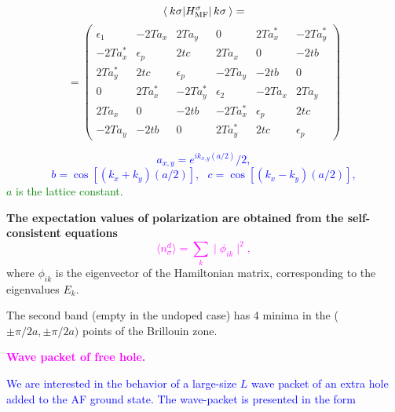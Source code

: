 \documentclass{article}
\begin{document}
\begin{Huge}
{{\newpage

\vspace{10mm}
\[
\langle \: k \sigma| H_{\rm MF}^\sigma | \, k \sigma\: \rangle =
\vspace{10mm}
\]
$$
=\left (
\begin{array}{cccccc}
\epsilon_1  & -2Ta_x & 2Ta_y & 0 & 2Ta_x^{\ast} & -2Ta_y^{\ast} \\
-2Ta_x^{\ast} & \epsilon_p & 2tc & 2Ta_x &  0  &       -2tb \\
2Ta_y^{\ast} & 2tc & \epsilon_p & -2Ta_y &   -2tb &       0 \\
 0  & 2Ta_x^{\ast} & -2Ta_y^{\ast} & \epsilon_2 & -2Ta_x & 2Ta_y \\
2Ta_x & 0 & -2tb & -2Ta_x^{\ast} &       \epsilon_p &       2tc \\
-2Ta_y & -2tb & 0 & 2Ta_y^{\ast} &       2tc &            \epsilon_p
\end{array}
\right )   \nonumber
$$


\vspace{2mm}
\textcolor{blue}{
$$
a_{x,y} =  e^{i k_{x,y} (a/2) }/2 ,
$$
$$
b = \cos [(k_x + k_y)(a/2)] , \ \ \
c = \cos [(k_x - k_y)(a/2)],
$$
}
\vspace{0.1cm}
\noindent
\textcolor{green}{
$a$ is the lattice constant. }


\vspace{1cm}



\noindent
{\bf The expectation values of polarization are obtained
from the self-consistent equations}
\textcolor{magenta}{
$$
\langle n_{\sigma}^d \rangle = \sum_k \mid \phi_{ik} \mid ^2 ,
$$
}
where $\phi_{ik}$ is the eigenvector of the Hamiltonian matrix,
corresponding to the eigenvalues $E_k$.


\noindent
The second band (empty in the undoped case) has 4 minima
in the ($\pm \pi / 2a ,\pm \pi /2a)$ points of the Brillouin zone.

\vspace{10mm}
\begin{center}
\textcolor{magenta}{
{\bf Wave packet of free hole.}}
\end{center}
\vspace{10mm}

\noindent
\textcolor{blue}{
We are interested in the behavior of
a large-size $L$ wave packet of an extra hole  added
to the AF ground state.
The wave-packet is presented in the form}

}}
\end{Huge}
\end{document}
